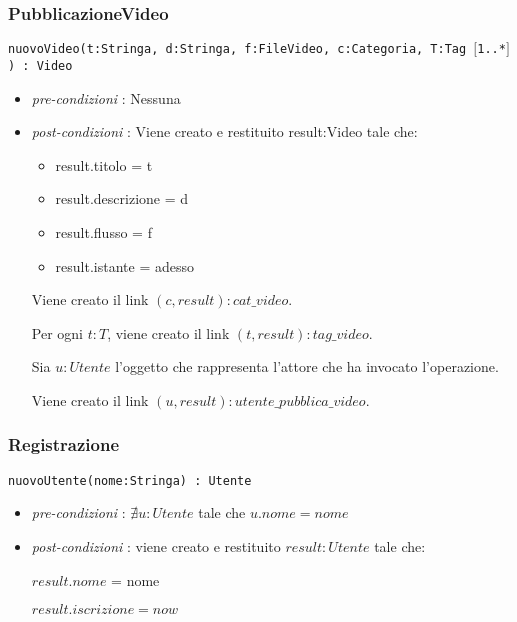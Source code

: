 \documentclass[12pt, letterpaper]{article}
\newcommand{\code}[1]{\colorbox{light-gray}{\texttt{#1}}}
\begin{document}
\subsubsection{PubblicazioneVideo}
\code{nuovoVideo(t:Stringa, d:Stringa, f:FileVideo, c:Categoria, T:Tag $[$1..*$]$) : Video }\begin{itemize}
    \item \textit{pre-condizioni} : Nessuna
    \item \textit{post-condizioni} :
          Viene creato e restituito result:Video tale che:\begin{itemize}
              \item  result.titolo = t
              \item  result.descrizione = d
              \item  result.flusso = f
              \item  result.istante = adesso
          \end{itemize}
          Viene creato il link $(c, result): cat\_video$.

          Per ogni $t:T$, viene creato il link $(t,result): tag\_video$.

          Sia $u:Utente$ l'oggetto che rappresenta l'attore che ha
          invocato l'operazione.

          Viene creato il link $(u,result): utente\_pubblica\_video$.
\end{itemize}
\subsubsection{Registrazione}
\code{nuovoUtente(nome:Stringa) : Utente}\begin{itemize}
    \item \textit{pre-condizioni} : $\nexists u:Utente$ tale che $u.nome = nome$
    \item \textit{post-condizioni} :
          viene creato e restituito $result:Utente$ tale che:

          $result.nome$ = nome

          $result.iscrizione=now$
\end{itemize}
\end{document}
